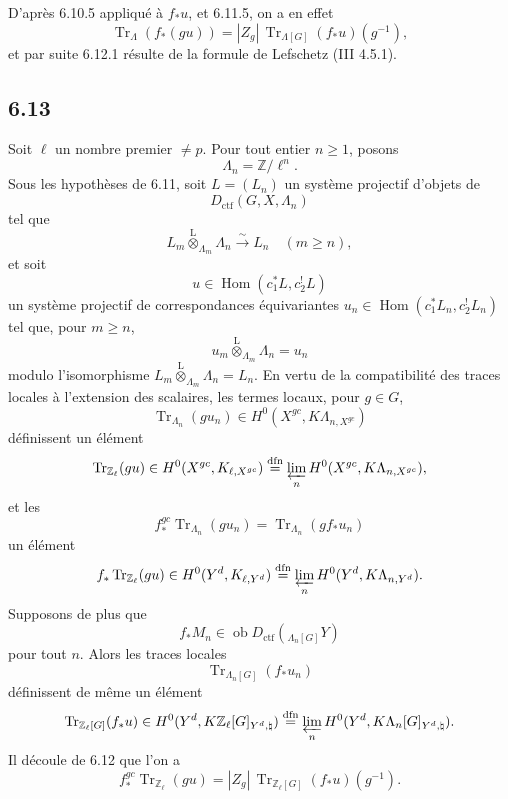 \documentclass[11pt]{article}
\DeclareMathOperator{\Hom}{Hom}
\providecommand{\Tr}{\operatorname{Tr}}
\providecommand{\Tr}{\operatorname{Tr}}
\providecommand{\lten}{\overset{\mathrm L}{\otimes}}
\providecommand{\Ob}{\operatorname{ob}}
\providecommand{\Tr}{\operatorname{Tr}}
\providecommand{\Hom}{\operatorname{Hom}}
\providecommand{\lten}{\overset{\mathrm L}{\otimes}}
\providecommand{\lten}{\overset{\mathrm L}{\otimes}}
\providecommand{\Ob}{\operatorname{ob}}
\providecommand{\Tr}{\operatorname{Tr}}
\providecommand{\lten}{\overset{\mathrm L}{\otimes}}
\providecommand{\lten}{\overset{\mathrm L}{\otimes}}
\providecommand{\Ob}{\operatorname{Ob}}
\providecommand{\lten}{\overset{\mathrm L}{\otimes}}
\providecommand{\Hom}{\operatorname{Hom}}
\providecommand{\Tr}{\operatorname{Tr}}
\providecommand{\Ob}{\operatorname{ob}}
\providecommand{\Ob}{\operatorname{Ob}}
\providecommand{\lten}{\overset{\mathrm L}{\otimes}}
\begin{document}
D'après 6.10.5 appliqué à $f_*u$, et 6.11.5, on a en effet
\[
\Tr_{\Lambda}(f_*(gu))=|Z_g|\,\Tr_{\Lambda[G]}(f_*u)(g^{-1}),
\]
et par suite 6.12.1 résulte de la formule de Lefschetz (III 4.5.1).

\subsection*{6.13}
Soit $\ell$ un nombre premier $\ne p$. Pour tout entier $n\ge1$, posons
\[
\Lambda_n=\mathbb Z/\ell^n.
\]
Sous les hypothèses de 6.11, soit $L=(L_n)$ un système projectif d'objets de
\[
D_{\mathrm{ctf}}(G,X,\Lambda_n)
\]
tel que
\[
L_m\lten_{\Lambda_m}\Lambda_n\xrightarrow{\sim}L_n\quad (m\ge n),
\]
et soit
\[
u\in\Hom(c_1^*L,c_2^!L)
\]
un système projectif de correspondances équivariantes $u_n\in\Hom(c_1^*L_n,c_2^!L_n)$ tel que, pour $m\ge n$,
\[
u_m\lten_{\Lambda_m}\Lambda_n=u_n
\]
modulo l'isomorphisme $L_m\lten_{\Lambda_m}\Lambda_n=L_n$. En vertu de la compatibilité des traces locales à l'extension des scalaires, les termes locaux, pour $g\in G$,
\[
\Tr_{\Lambda_n}(gu_n)\in H^0(X^{gc},K\Lambda_{n,X^{gc}})
\]
définissent un élément
\[
\Tr_{\mathbb Z_{\ell}}(gu)\in
H^0(X^{gc},K_{\ell,X^{gc}})
\stackrel{\mathrm{dfn}}{=}
\varprojlim_n H^0(X^{gc},K\Lambda_{n,X^{gc}}),
\]
et les
\[
f_*^{gc}\Tr_{\Lambda_n}(gu_n)=\Tr_{\Lambda_n}(gf_*u_n)
\]
un élément
\[
f_*\Tr_{\mathbb Z_{\ell}}(gu)\in
H^0(Y^d,K_{\ell,Y^d})
\stackrel{\mathrm{dfn}}{=}
\varprojlim_n H^0(Y^d,K\Lambda_{n,Y^d}).
\]
Supposons de plus que
\[
f_*M_n\in\Ob D_{\mathrm{ctf}}({}_{\Lambda_n[G]}Y)
\]
pour tout $n$. Alors les traces locales
\[
\Tr_{\Lambda_n[G]}(f_*u_n)
\]
définissent de même un élément
\[
\Tr_{\mathbb Z_{\ell}[G]}(f_*u)\in
H^0(Y^d,K\mathbb Z_{\ell}[G]_{Y^d,\natural})
\stackrel{\mathrm{dfn}}{=}
\varprojlim_n H^0(Y^d,K\Lambda_n[G]_{Y^d,\natural}).
\]
Il découle de 6.12 que l'on a
\begin{equation}
f_*^{gc}\Tr_{\mathbb Z_{\ell}}(gu)
=
|Z_g|\,\Tr_{\mathbb Z_{\ell}[G]}(f_*u)(g^{-1}).
\tag{6.13.1}
\end{equation}
\end{document}
